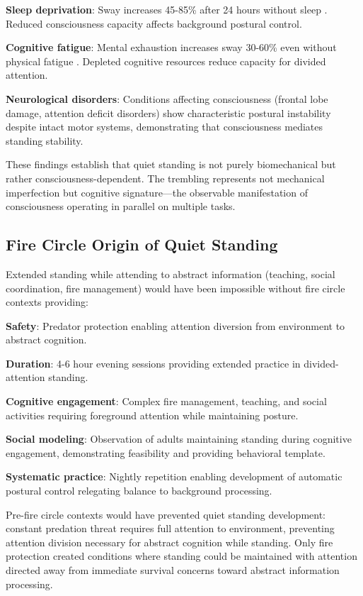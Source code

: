 \textbf{Sleep deprivation}: Sway increases 45-85\% after 24 hours without sleep \citep{robillard2011sleep}. Reduced consciousness capacity affects background postural control.

\textbf{Cognitive fatigue}: Mental exhaustion increases sway 30-60\% even without physical fatigue \citep{lorist2002mental}. Depleted cognitive resources reduce capacity for divided attention.

\textbf{Neurological disorders}: Conditions affecting consciousness (frontal lobe damage, attention deficit disorders) show characteristic postural instability despite intact motor systems, demonstrating that consciousness mediates standing stability.

These findings establish that quiet standing is not purely biomechanical but rather consciousness-dependent. The trembling represents not mechanical imperfection but cognitive signature—the observable manifestation of consciousness operating in parallel on multiple tasks.

\subsection{Fire Circle Origin of Quiet Standing}

Extended standing while attending to abstract information (teaching, social coordination, fire management) would have been impossible without fire circle contexts providing:

\textbf{Safety}: Predator protection enabling attention diversion from environment to abstract cognition.

\textbf{Duration}: 4-6 hour evening sessions providing extended practice in divided-attention standing.

\textbf{Cognitive engagement}: Complex fire management, teaching, and social activities requiring foreground attention while maintaining posture.

\textbf{Social modeling}: Observation of adults maintaining standing during cognitive engagement, demonstrating feasibility and providing behavioral template.

\textbf{Systematic practice}: Nightly repetition enabling development of automatic postural control relegating balance to background processing.

Pre-fire circle contexts would have prevented quiet standing development: constant predation threat requires full attention to environment, preventing attention division necessary for abstract cognition while standing. Only fire protection created conditions where standing could be maintained with attention directed away from immediate survival concerns toward abstract information processing.

